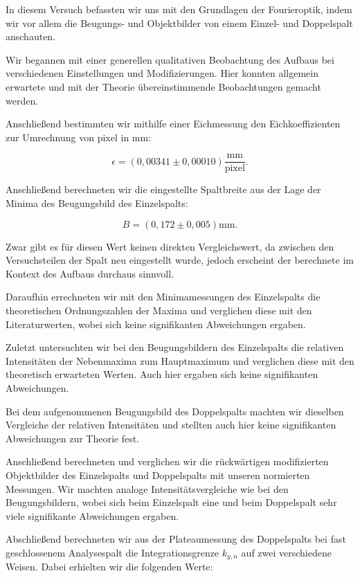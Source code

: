 \documentclass{article}
\begin{document}
In diesem Versuch befassten wir uns mit den Grundlagen der Fourieroptik, indem wir vor allem die Beugungs- und Objektbilder von einem Einzel- und Doppelspalt anschauten. 

Wir begannen mit einer generellen qualitativen Beobachtung des Aufbaus bei verschiedenen Einstellungen und Modifizierungen. Hier konnten allgemein erwartete und mit der Theorie übereinstimmende Beobachtungen gemacht werden. 

Anschließend bestimmten wir mithilfe einer Eichmessung den Eichkoeffizienten zur Umrechnung von pixel in mm:

\begin{equation}
    \epsilon = (0,00341 \pm 0,00010) \frac{\text{mm}}{\text{pixel}}.
\end{equation}

Anschließend berechneten wir die eingestellte Spaltbreite aus der Lage der Minima des Beugungsbild des Einzelspalts:

\begin{equation}
    B = (0,172 \pm 0,005) \text{mm}.
\end{equation}

Zwar gibt es für diesen Wert keinen direkten Vergleichswert, da zwischen den Versuchsteilen der Spalt neu eingestellt wurde, jedoch erscheint der berechnete im Kontext des Aufbaus durchaus sinnvoll.

Daraufhin errechneten wir mit den Minimamessungen des Einzelspalts die theoretischen Ordnungszahlen der Maxima und verglichen diese mit den Literaturwerten, wobei sich keine signifikanten Abweichungen ergaben. 

Zuletzt untersuchten wir bei den Beugungsbildern des Einzelspalts die relativen Intensitäten der Nebenmaxima zum Hauptmaximum und verglichen diese mit den theoretisch erwarteten Werten. Auch hier ergaben sich keine signifikanten Abweichungen.

Bei dem aufgenommenen Beugungsbild des Doppelspalts machten wir dieselben Vergleiche der relativen Intensitäten und stellten auch hier keine signifikanten Abweichungen zur Theorie fest.

Anschließend berechneten und verglichen wir die rückwärtigen modifizierten Objektbilder des Einzelspalts und Doppelspalts mit unseren normierten Messungen. Wir machten analoge Intensitätsvergleiche wie bei den Beugungsbildern, wobei sich beim Einzelspalt eine und beim Doppelspalt sehr viele signifikante Abweichungen ergaben. 

Abschließend berechneten wir aus der Plateaumessung des Doppelspalts bei fast geschlossenem Analysespalt die Integrationsgrenze $k_{y,n}$ auf zwei verschiedene Weisen. Dabei erhielten wir die folgenden Werte:
\end{document}
